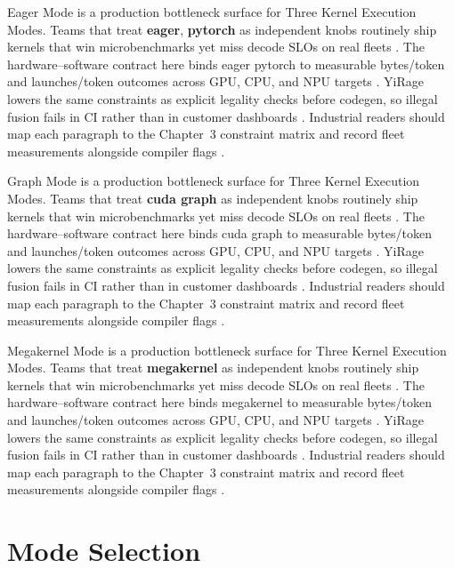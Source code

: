 Eager Mode is a production bottleneck surface for Three Kernel Execution Modes. Teams that treat \textbf{eager}, \textbf{pytorch} as independent knobs routinely ship kernels that win microbenchmarks yet miss decode SLOs on real fleets \citep{patel2025llminference,nvidia2022hopper}. The hardware--software contract here binds eager pytorch to measurable bytes/token and launches/token outcomes across GPU, CPU, and NPU targets \citep{taxbreak2026,semianalysis2024tma}. YiRage lowers the same constraints as explicit legality checks before codegen, so illegal fusion fails in CI rather than in customer dashboards \citep{memoryfloor2026,amd2024xdna}. Industrial readers should map each paragraph to the Chapter~3 constraint matrix and record fleet measurements alongside compiler flags \citep{nvidia2022hopper,amd2024aie}.

Graph Mode is a production bottleneck surface for Three Kernel Execution Modes. Teams that treat \textbf{cuda graph} as independent knobs routinely ship kernels that win microbenchmarks yet miss decode SLOs on real fleets \citep{taxbreak2026,semianalysis2024tma}. The hardware--software contract here binds cuda graph to measurable bytes/token and launches/token outcomes across GPU, CPU, and NPU targets \citep{memoryfloor2026,amd2024xdna}. YiRage lowers the same constraints as explicit legality checks before codegen, so illegal fusion fails in CI rather than in customer dashboards \citep{nvidia2022hopper,amd2024aie}. Industrial readers should map each paragraph to the Chapter~3 constraint matrix and record fleet measurements alongside compiler flags \citep{semianalysis2024tma,dlbook}.

Megakernel Mode is a production bottleneck surface for Three Kernel Execution Modes. Teams that treat \textbf{megakernel} as independent knobs routinely ship kernels that win microbenchmarks yet miss decode SLOs on real fleets \citep{memoryfloor2026,amd2024xdna}. The hardware--software contract here binds megakernel to measurable bytes/token and launches/token outcomes across GPU, CPU, and NPU targets \citep{nvidia2022hopper,amd2024aie}. YiRage lowers the same constraints as explicit legality checks before codegen, so illegal fusion fails in CI rather than in customer dashboards \citep{semianalysis2024tma,dlbook}. Industrial readers should map each paragraph to the Chapter~3 constraint matrix and record fleet measurements alongside compiler flags \citep{amd2024xdna,dao2022flashattention}.

\section{Mode Selection}
\label{sec:mode_selection}

